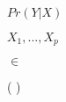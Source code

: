 $Pr(Y \vert X)$  %

$X_1, ..., X_p$ %

$\in$ %

\left [ \right ] %
\left { \right } %
\left ( \right ) %
